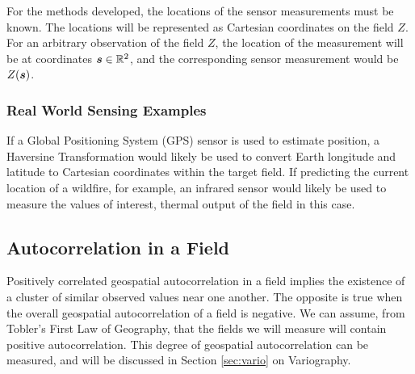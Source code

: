 \documentclass[11pt]{ucthesis}
\newcommand{\vect}[1]{{\it{\boldsymbol{#1}}}}
\begin{document}
For the methods developed, the locations of the sensor measurements must be known. The locations will be represented as Cartesian coordinates on the field $Z$. For an arbitrary observation of the field $Z$, the location of the measurement will be at coordinates $\vect{s} \in \mathbb{R}^2$, and the corresponding sensor measurement would be $Z(\vect{s})$. 

\subsubsection{Real World Sensing Examples}
If a Global Positioning System (GPS) sensor is used to estimate position, a Haversine Transformation would likely be used to convert Earth longitude and latitude to Cartesian coordinates within the target field. If predicting the current location of a wildfire, for example, an infrared sensor would likely be used to measure the values of interest, thermal output of the field in this case.

\subsection{Autocorrelation in a Field}
Positively correlated geospatial autocorrelation in a field implies the existence of a cluster of similar observed values near one another. The opposite is true when the overall geospatial autocorrelation of a field is negative. We can assume, from Tobler's First Law of Geography, that the fields we will measure will contain positive autocorrelation. This degree of geospatial autocorrelation can be measured, and will be discussed in Section \ref{sec:vario} on Variography.
\end{document}
